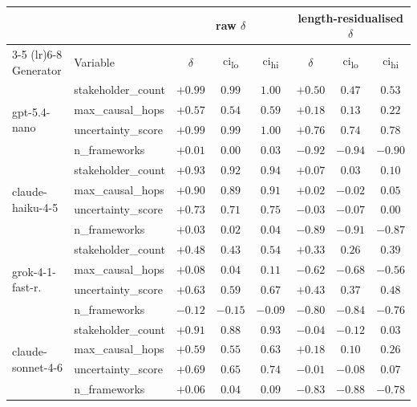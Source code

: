 \documentclass[11pt]{article}
\begin{document}
\begin{table}[!tbp]
\centering
\small
\setlength{\tabcolsep}{6pt}
\begin{tabular}{llcccccc}
\toprule
& & \multicolumn{3}{c}{raw $\delta$} & \multicolumn{3}{c}{length-residualised $\delta$} \\
\cmidrule(lr){3-5} \cmidrule(lr){6-8}
Generator & Variable & $\delta$ & ci\textsubscript{lo} & ci\textsubscript{hi} & $\delta$ & ci\textsubscript{lo} & ci\textsubscript{hi} \\
\midrule
\multirow{4}{*}{gpt-5.4-nano}
  & stakeholder\_count  & $+0.99$ & $0.99$ & $1.00$ & $+0.50$ & $0.47$  & $0.53$  \\
  & max\_causal\_hops   & $+0.57$ & $0.54$ & $0.59$ & $+0.18$ & $0.13$  & $0.22$  \\
  & uncertainty\_score  & $+0.99$ & $0.99$ & $1.00$ & $+0.76$ & $0.74$  & $0.78$  \\
  & n\_frameworks       & $+0.01$ & $0.00$ & $0.03$ & $-0.92$ & $-0.94$ & $-0.90$ \\
\midrule
\multirow{4}{*}{claude-haiku-4-5}
  & stakeholder\_count  & $+0.93$ & $0.92$ & $0.94$ & $+0.07$ & $0.03$  & $0.10$  \\
  & max\_causal\_hops   & $+0.90$ & $0.89$ & $0.91$ & $+0.02$ & $-0.02$ & $0.05$  \\
  & uncertainty\_score  & $+0.73$ & $0.71$ & $0.75$ & $-0.03$ & $-0.07$ & $0.00$  \\
  & n\_frameworks       & $+0.03$ & $0.02$ & $0.04$ & $-0.89$ & $-0.91$ & $-0.87$ \\
\midrule
\multirow{4}{*}{grok-4-1-fast-r.}
  & stakeholder\_count  & $+0.48$ & $0.43$  & $0.54$ & $+0.33$ & $0.26$  & $0.39$  \\
  & max\_causal\_hops   & $+0.08$ & $0.04$  & $0.11$ & $-0.62$ & $-0.68$ & $-0.56$ \\
  & uncertainty\_score  & $+0.63$ & $0.59$  & $0.67$ & $+0.43$ & $0.37$  & $0.48$  \\
  & n\_frameworks       & $-0.12$ & $-0.15$ & $-0.09$& $-0.80$ & $-0.84$ & $-0.76$ \\
\midrule
\multirow{4}{*}{claude-sonnet-4-6}
  & stakeholder\_count  & $+0.91$ & $0.88$ & $0.93$ & $-0.04$ & $-0.12$ & $0.03$  \\
  & max\_causal\_hops   & $+0.59$ & $0.55$ & $0.63$ & $+0.18$ & $0.10$  & $0.26$  \\
  & uncertainty\_score  & $+0.69$ & $0.65$ & $0.74$ & $-0.01$ & $-0.08$ & $0.07$  \\
  & n\_frameworks       & $+0.06$ & $0.04$ & $0.09$ & $-0.83$ & $-0.88$ & $-0.78$ \\

\end{tabular}
\end{table}
\end{document}
